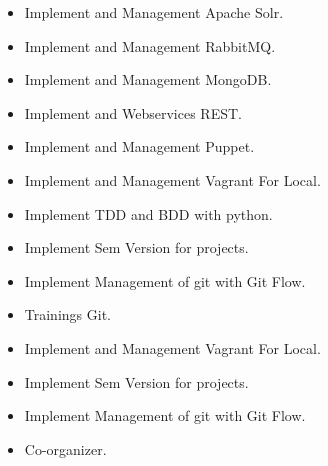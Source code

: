 \documentclass[10pt,a4paper]{altacv}
\begin{document}
\begin{itemize}
  \item Implement and Management Apache Solr.
  \item Implement and Management RabbitMQ.
  \item Implement and Management MongoDB.
  \item Implement and Webservices REST.
  \item Implement and Management Puppet.
  \item Implement and Management Vagrant For Local.
  \item Implement TDD and BDD with python.
  \item Implement Sem Version for projects.
  \item Implement Management of git with Git Flow.
\end{itemize}
\divider

\begin{itemize}
  \item Trainings Git.
  \item Implement and Management Vagrant For Local.
  \item Implement Sem Version for projects.
  \item Implement Management of git with Git Flow.
\end{itemize}



\clearpage


\nocite{*}

\begin{itemize}
  \item Co-organizer.
\end{itemize}
\end{document}
